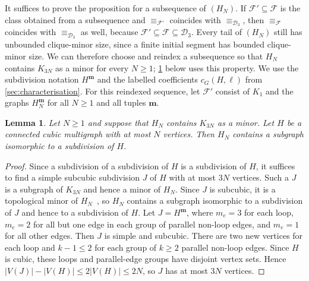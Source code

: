 \documentclass[11pt,a4paper]{article}
\theoremstyle{plain}
\newtheorem{lemma}[theorem]{Lemma}
\theoremstyle{definition}
\newcommand{\calF}{\mathcal{F}}
\begin{document}
It suffices to prove the proposition for a subsequence of $(H_N)$.
If $\calF'\subseteq\calF$ is the class obtained from a subsequence and
$\equiv_{\calF'}$ coincides with $\equiv_{\mathcal D_3}$, then
$\equiv_{\calF}$ coincides with $\equiv_{\mathcal D_3}$ as well, because
$\calF'\subseteq\calF\subseteq\mathcal D_3$.
Every tail of $(H_N)$ still has unbounded clique-minor size, since a finite
initial segment has bounded clique-minor size. We can therefore choose
and reindex a subsequence so that $H_N$ contains $K_{3N}$ as
a minor for every $N\geq1$; \cref{lem:subdivision-containment} below uses this
property.
We use the subdivision notation $H^{\mathbf m}$ and the labelled
coefficients $c_G(H,\ell)$ from \cref{sec:characterisation}.
For this reindexed sequence, let $\calF'$ consist
of $K_1$ and the graphs $H_N^{\mathbf m}$ for all $N\geq1$ and all tuples $\mathbf m$.

\begin{lemma}\label{lem:subdivision-containment}
 Let $N\geq1$ and suppose that $H_N$ contains $K_{3N}$ as a minor.
 Let $H$ be a connected cubic multigraph with at most $N$ vertices.
 Then $H_N$ contains a subgraph isomorphic to a subdivision of $H$.
\end{lemma}
\begin{proof}
 Since a subdivision of a subdivision of $H$ is a subdivision of $H$, it
 suffices to find a simple subcubic subdivision $J$ of $H$ with at most
 $3N$ vertices. Such a $J$ is a subgraph of $K_{3N}$ and hence a
 minor of $H_N$. Since $J$ is subcubic, it is a topological minor
 of $H_N$~\cite[Section~1.7]{Diestel2017}, so $H_N$ contains a subgraph
 isomorphic to a subdivision of $J$ and hence to a subdivision of $H$.
 Let $J=H^{\mathbf m}$, where $m_e=3$ for each loop, $m_e=2$ for all
 but one edge in each group of parallel non-loop edges, and $m_e=1$
 for all other edges.
 Then $J$ is simple and subcubic. There are two new vertices for each
 loop and $k-1\leq2$ for each group of $k\geq2$ parallel non-loop edges.
 Since $H$ is cubic, these loops and parallel-edge groups have
 disjoint vertex sets. Hence $|V(J)|-|V(H)|\leq2|V(H)|\leq2N$,
 so $J$ has at most $3N$ vertices.
\end{proof}
\end{document}
